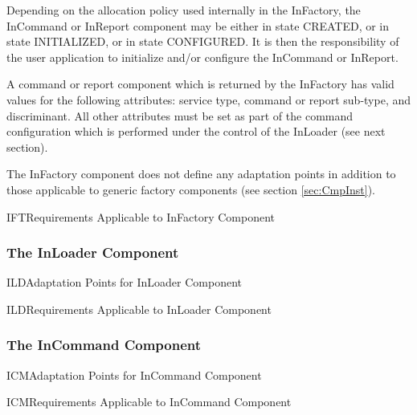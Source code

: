 \documentclass{pnp_article}
\begin{document}
Depending on the allocation policy used internally in the InFactory, the InCommand or InReport component may be either in state CREATED, or in state INITIALIZED, or in state CONFIGURED. It is then the responsibility of the user application to initialize and/or configure the InCommand or InReport.

A command or report component which is returned by the InFactory has valid values for the following attributes: service type, command or report sub-type, and discriminant. All other attributes must be set as part of the command configuration which is performed under the control of the InLoader (see next section).

The InFactory component does not define any adaptation points in addition to those applicable to generic factory components (see section \ref{sec:CmpInst}). 

\begin{crReq}{IFT}{Requirements Applicable to InFactory Component}
\end{crReq}


\subsubsection{The InLoader Component}\label{sec:InLoader}


\begin{crAp}{ILD}{Adaptation Points for InLoader Component}
\end{crAp}

\begin{crReq}{ILD}{Requirements Applicable to InLoader Component}
\end{crReq}

\subsubsection{The InCommand Component}\label{sec:InCommand}


\begin{crAp}{ICM}{Adaptation Points for InCommand Component}
\end{crAp}

\begin{crReq}{ICM}{Requirements Applicable to InCommand Component}
\end{crReq}
\end{document}
